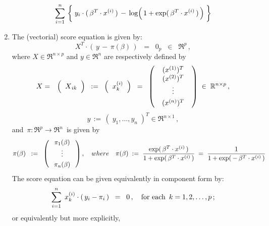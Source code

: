 \begin{proposition}
\begin{enumerate}
\begin{eqnarray*}
		\overset{n}{\underset{i=1}{\sum}}\,
		\left\{\;
			y_{i}\cdot(\,\beta^{T} \cdot x^{(i)}\,)
			\, \overset{{\color{white}\vert}}{-} \,
			\log\!\left(\,1 + \exp(\,\beta^{T} \cdot x^{(i)}\,)\,\right)
			\;\right\}
	\end{eqnarray*}
\item\label{logisticScoreEqn}
	The (vectorial) score equation is given by:
	\begin{equation*}
	X^{T} \cdot \left(\, y \,-\, \pi(\beta) \,\right) \;\; = \;\; 0_{p} \;\; \in \;\; \Re^{p}\,,
	\end{equation*}
	where $X \in \Re^{n \times p}$ and $y \in \Re^{n}$ are respectively defined by
	\begin{eqnarray*}
	X
	&=&
		\left(\;\;\overset{{\color{white}.}}{X}_{ik}\;\;\right)
	\;\;:=\;\;
		\left(\;\; x^{(i)}_{k} \;\;\right)
	\;\;=\;\;
		\left(\;\;
			\begin{array}{c} (x^{(1)})^{T} \\ (x^{(2)})^{T} \\ \underset{{\color{white}1}}{\vdots} \\ (x^{(n)})^{T} \end{array}
			\;\;\right)
	\; \in \; \Re^{n \times p}\,,
	\end{eqnarray*}
	\begin{equation*}
	y \,:=\, \left(\;y_{1},\ldots,y_{n}\;\right)^{T} \in \Re^{n \times 1}\,, 
	\end{equation*}
	and \,$\pi : \Re^{p} \longrightarrow \Re^{n}$\, is given by
	\begin{equation*}
	\pi(\beta) \;\;:=\;\; \left(\;
		\begin{array}{c} \pi_{1}(\beta) \\ \underset{{\color{white}^{.}}}{\vdots} \\ \pi_{n}(\beta) \end{array}
		\;\right),
	\quad{where}\quad
	\pi(\beta)
	\; := \;
		\dfrac{\exp(\,\beta^{T} \cdot x^{(i)}\,)}{1 + \exp(\,\beta^{T} \cdot x^{(i)}\,)}
	\; = \;
		\dfrac{1}{1 + \exp(\,-\,\beta^{T} \cdot x^{(i)}\,)}
	\end{equation*}
	The score equation can be given equivalently in component form by:
	\begin{equation*}
	\overset{n}{\underset{i=1}{\sum}}\;\, x^{(i)}_{k} \cdot \left(\,y_{i} - \pi_{i}\,\right)
	\;\; = \;\; 0\,,
	\quad
	\textnormal{for each \,$k = 1, 2,\ldots,p$}\,;
	\end{equation*}
	or equivalently but more explicitly,
	\begin{equation*}

\end{equation*}
\end{enumerate}
\end{proposition}
